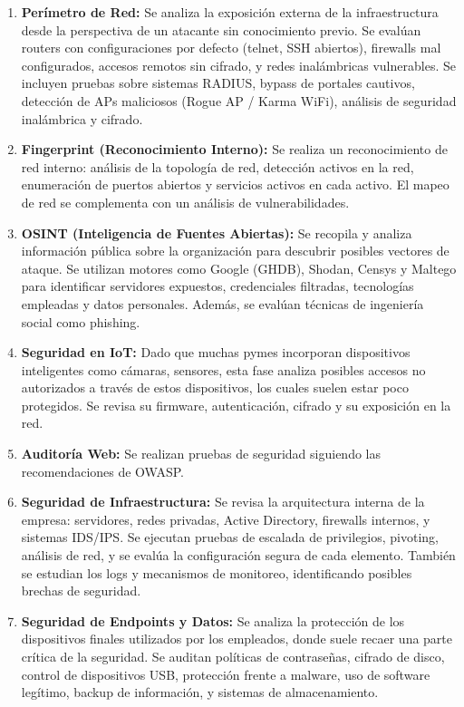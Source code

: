 \documentclass[a4paper, 10pt]{article}
\begin{document}
\begin{enumerate}
    \item \textbf{Perímetro de Red:} Se analiza la exposición externa de la infraestructura desde la perspectiva de un atacante sin conocimiento previo. Se evalúan routers con configuraciones por defecto (telnet, SSH abiertos), firewalls mal configurados, accesos remotos sin cifrado, y redes inalámbricas vulnerables. Se incluyen pruebas sobre sistemas RADIUS, bypass de portales cautivos, detección de APs maliciosos (Rogue AP / Karma WiFi), análisis de seguridad inalámbrica y cifrado.

\item \textbf{Fingerprint (Reconocimiento Interno):} Se realiza un reconocimiento de red interno: análisis de la topología de red, detección activos en la red, enumeración de puertos abiertos y servicios activos en cada activo. 
El mapeo de red se complementa con un análisis de vulnerabilidades.

\item \textbf{OSINT (Inteligencia de Fuentes Abiertas):} Se recopila y analiza información pública sobre la organización para descubrir posibles vectores de ataque. Se utilizan motores como Google (GHDB), Shodan, Censys y Maltego para identificar servidores expuestos, credenciales filtradas, tecnologías empleadas y datos personales. Además, se evalúan técnicas de ingeniería social como phishing.

\item \textbf{Seguridad en IoT:} Dado que muchas pymes incorporan dispositivos inteligentes como cámaras, sensores, esta fase analiza posibles accesos no autorizados a través de estos dispositivos, los cuales suelen estar poco protegidos. Se revisa su firmware, autenticación, cifrado y su exposición en la red.
\item \textbf{Auditoría Web:} Se realizan pruebas de seguridad siguiendo las recomendaciones de OWASP. 

\item \textbf{Seguridad de Infraestructura:} Se revisa la arquitectura interna de la empresa: servidores, redes privadas, Active Directory, firewalls internos, y sistemas IDS/IPS. Se ejecutan pruebas de escalada de privilegios, pivoting, análisis de red, y se evalúa la configuración segura de cada elemento. También se estudian los logs y mecanismos de monitoreo, identificando posibles brechas de seguridad.

\item \textbf{Seguridad de Endpoints y Datos:} Se analiza la protección de los dispositivos finales utilizados por los empleados, donde suele recaer una parte crítica de la seguridad. Se auditan políticas de contraseñas, cifrado de disco, control de dispositivos USB, protección frente a malware, uso de software legítimo, backup de información, y sistemas de almacenamiento.

\end{enumerate}
\end{document}
